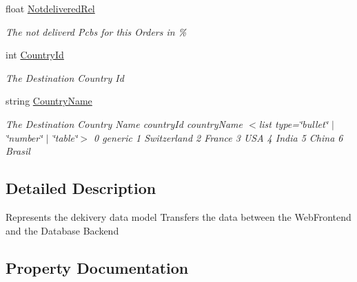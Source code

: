 \begin{DoxyCompactItemize}
float \hyperlink{classkpi_mvc_api_1_1_data_transfer_objects_1_1_delivery_data_dto_a1e3339296b2d0ff87864895fceeea749}{Notdelivered\+Rel}
\begin{DoxyCompactList}\small\item\em The not deliverd Pcb\textquotesingle{}s for this Orders in \% \end{DoxyCompactList}\item 
int \hyperlink{classkpi_mvc_api_1_1_data_transfer_objects_1_1_delivery_data_dto_ae2d607a8f16fc669d1eecffd20676677}{Country\+Id}
\begin{DoxyCompactList}\small\item\em The Destination Country Id \end{DoxyCompactList}\item 
string \hyperlink{classkpi_mvc_api_1_1_data_transfer_objects_1_1_delivery_data_dto_aa192790f89f53d41758304d762654046}{Country\+Name}
\begin{DoxyCompactList}\small\item\em The Destination Country Name country\+Id country\+Name $<$list type=\char`\"{}bullet\char`\"{} $\vert$ \char`\"{}number\char`\"{} $\vert$ \char`\"{}table\char`\"{}$>$ 0 generic 1 Switzerland 2 France 3 U\+SA 4 India 5 China 6 Brasil \end{DoxyCompactList}\end{DoxyCompactItemize}


\subsection{Detailed Description}
Represents the dekivery data model Transfers the data between the Web\+Frontend and the Database Backend 



\subsection{Property Documentation}
\mbox{\label{classkpi_mvc_api_1_1_data_transfer_objects_1_1_delivery_data_dto_ae2d607a8f16fc669d1eecffd20676677}} 
